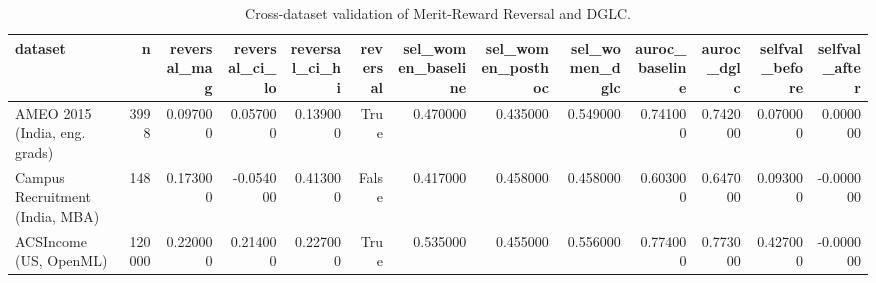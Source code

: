 \begin{table}
\caption{Cross-dataset validation of Merit-Reward Reversal and DGLC.}
\label{tab:cross_dataset}
\begin{tabular}{lrrrrrrrrrrrr}
\toprule
dataset & n & reversal\_mag & reversal\_ci\_lo & reversal\_ci\_hi & reversal & sel\_women\_baseline & sel\_women\_posthoc & sel\_women\_dglc & auroc\_baseline & auroc\_dglc & selfval\_before & selfval\_after \\
\midrule
AMEO 2015 (India, eng. grads) & 3998 & 0.097000 & 0.057000 & 0.139000 & True & 0.470000 & 0.435000 & 0.549000 & 0.741000 & 0.742000 & 0.070000 & 0.000000 \\
Campus Recruitment (India, MBA) & 148 & 0.173000 & -0.054000 & 0.413000 & False & 0.417000 & 0.458000 & 0.458000 & 0.603000 & 0.647000 & 0.093000 & -0.000000 \\
ACSIncome (US, OpenML) & 120000 & 0.220000 & 0.214000 & 0.227000 & True & 0.535000 & 0.455000 & 0.556000 & 0.774000 & 0.773000 & 0.427000 & -0.000000 \\
\bottomrule
\end{tabular}
\end{table}
